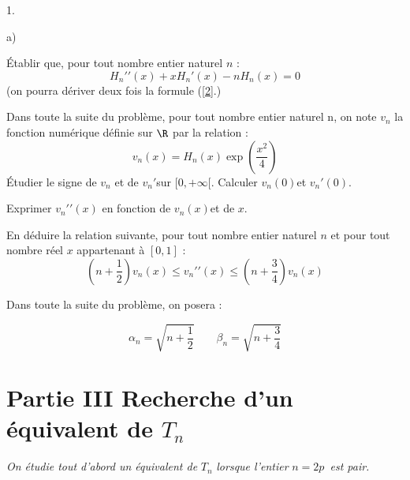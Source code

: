 \documentclass[11pt]{article}%
\begin{document}
\begin{noliste}{1.}
\item 

\begin{noliste}{a)}
 \setlength{\itemsep}{2mm}
\item Établir que, pour tout nombre entier naturel $n$ : 
\[
H_{n}{\prime \prime }(x) + xH_{n}{\prime }(x)-nH_{n}(x) = 0
\]
(on pourra dériver deux fois la formule (\ref{2}.)

\item Dans toute la suite du problème, pour tout nombre entier naturel
n, on
note $v_{n}$ la fonction numérique définie sur $\R$ par la relation :
\[
v_{n}(x) = H_{n}(x)\exp (\dfrac{x^{2}}{4})
\]
Étudier le signe de $v_{n}$ et de $v_{n}{\prime }$sur $[0, + \infty
\lbrack $. Calculer $v_{n}(0)$et $v_{n}{\prime }(0)$.

\item Exprimer $v_{n}{\prime \prime }(x)$ en fonction de $v_{n}(x)$et
de $x$.

\item En déduire la relation suivante, pour tout nombre entier naturel
$n$
et pour tout nombre réel $x$ appartenant à $[0,1]$ : 
\begin{equation}
(n + \dfrac{1}{2})v_{n}(x)\leq v_{n}{\prime \prime }(x)\leq (n +
\dfrac{3}{4})v_{n}(x) \label{5}
\end{equation}
\end{noliste}
\end{noliste}

\noindent Dans toute la suite du problème, on posera :

\[
\alpha_{n} = \sqrt{n + \dfrac{1}{2}}\qquad \beta_{n} = \sqrt{n +
\dfrac{3}{4}}
\]

\section*{Partie III Recherche d'un équivalent de $T_{n}$}

\textit{On étudie tout d'abord un équivalent de }$T_{n}$
\textit{lorsque
l'entier }$n = 2p$\textit{\ est pair.}
\end{document}
